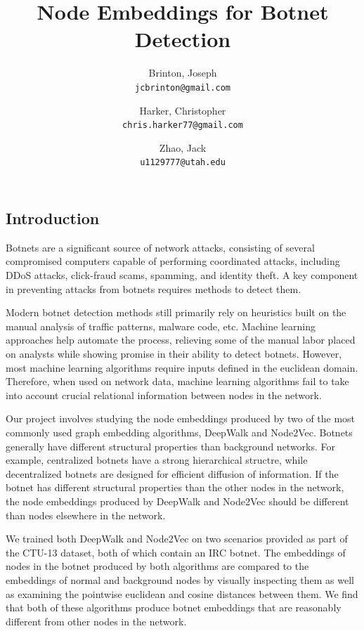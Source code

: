 \documentclass[10pt]{article}
\title{Node Embeddings for Botnet Detection}
\author{
	Brinton, Joseph\\
	\texttt{jcbrinton@gmail.com}
	\and
	Harker, Christopher\\
	\texttt{chris.harker77@gmail.com}
	\and
	Zhao, Jack\\
	\texttt{u1129777@utah.edu}
}
\begin{document}
\maketitle

\begin{multicols}{2}

\section{Introduction}

Botnets are a significant source of network attacks, consisting of several compromised computers capable of performing coordinated attacks, including DDoS attacks, click-fraud scams, spamming, and identity theft. A key component in preventing attacks from botnets requires methods to detect them.

Modern botnet detection methods still primarily rely on heuristics built on the manual analysis of traffic patterns, malware code, etc. Machine learning approaches help automate the process, relieving some of the manual labor placed on analysts while showing promise in their ability to detect botnets. However, most machine learning algorithms require inputs defined in the euclidean domain. Therefore, when used on network data, machine learning algorithms fail to take into account crucial relational information between nodes in the network. 

Our project involves studying the node embeddings produced by two of the most commonly used graph embedding algorithms, DeepWalk and Node2Vec. Botnets generally have different structural properties than background networks. For example, centralized botnets have a strong hierarchical structre, while decentralized botnets are designed for efficient diffusion of information. If the botnet has different structural properties than the other nodes in the network, the node embeddings produced by DeepWalk and Node2Vec should be different than nodes elsewhere in the network. 

We trained both DeepWalk \cite{Perozzi} and Node2Vec \cite{Grover} on two scenarios provided as part of the CTU-13 \cite{Garcia} dataset, both of which contain an IRC botnet. The embeddings of nodes in the botnet produced by both algorithms are compared to the embeddings of normal and background nodes by visually inspecting them as well as examining the pointwise euclidean and cosine distances between them. We find that both of these algorithms produce botnet embeddings that are reasonably different from other nodes in the network. 


\end{multicols}
\end{document}
